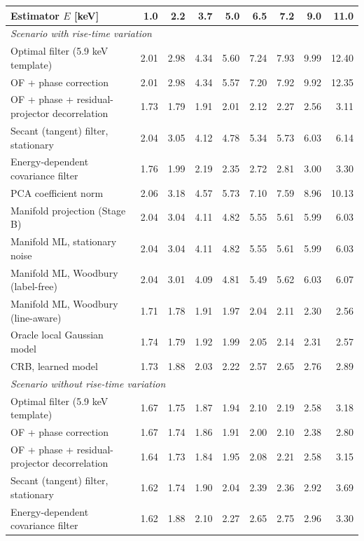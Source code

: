 \begin{tabular}{lrrrrrrrr}
\toprule
Estimator \hfill $E$ [keV] & 1.0 & 2.2 & 3.7 & 5.0 & 6.5 & 7.2 & 9.0 & 11.0 \\
\midrule
\multicolumn{9}{l}{\emph{Scenario with rise-time variation}}\\
Optimal filter (5.9 keV template) & 2.01 & 2.98 & 4.34 & 5.60 & 7.24 & 7.93 & 9.99 & 12.40 \\
OF + phase correction & 2.01 & 2.98 & 4.34 & 5.57 & 7.20 & 7.92 & 9.92 & 12.35 \\
OF + phase + residual-projector decorrelation & 1.73 & 1.79 & 1.91 & 2.01 & 2.12 & 2.27 & 2.56 & 3.11 \\
Secant (tangent) filter, stationary & 2.04 & 3.05 & 4.12 & 4.78 & 5.34 & 5.73 & 6.03 & 6.14 \\
Energy-dependent covariance filter & 1.76 & 1.99 & 2.19 & 2.35 & 2.72 & 2.81 & 3.00 & 3.30 \\
PCA coefficient norm & 2.06 & 3.18 & 4.57 & 5.73 & 7.10 & 7.59 & 8.96 & 10.13 \\
Manifold projection (Stage B) & 2.04 & 3.04 & 4.11 & 4.82 & 5.55 & 5.61 & 5.99 & 6.03 \\
Manifold ML, stationary noise & 2.04 & 3.04 & 4.11 & 4.82 & 5.55 & 5.61 & 5.99 & 6.03 \\
Manifold ML, Woodbury (label-free) & 2.04 & 3.01 & 4.09 & 4.81 & 5.49 & 5.62 & 6.03 & 6.07 \\
Manifold ML, Woodbury (line-aware) & 1.71 & 1.78 & 1.91 & 1.97 & 2.04 & 2.11 & 2.30 & 2.56 \\
Oracle local Gaussian model & 1.74 & 1.79 & 1.92 & 1.99 & 2.05 & 2.14 & 2.31 & 2.57 \\
CRB, learned model & 1.73 & 1.88 & 2.03 & 2.22 & 2.57 & 2.65 & 2.76 & 2.89 \\
\midrule
\multicolumn{9}{l}{\emph{Scenario without rise-time variation}}\\
Optimal filter (5.9 keV template) & 1.67 & 1.75 & 1.87 & 1.94 & 2.10 & 2.19 & 2.58 & 3.18 \\
OF + phase correction & 1.67 & 1.74 & 1.86 & 1.91 & 2.00 & 2.10 & 2.38 & 2.80 \\
OF + phase + residual-projector decorrelation & 1.64 & 1.73 & 1.84 & 1.95 & 2.08 & 2.21 & 2.58 & 3.15 \\
Secant (tangent) filter, stationary & 1.62 & 1.74 & 1.90 & 2.04 & 2.39 & 2.36 & 2.92 & 3.69 \\
Energy-dependent covariance filter & 1.62 & 1.88 & 2.10 & 2.27 & 2.65 & 2.75 & 2.96 & 3.30 \\

\end{tabular}
